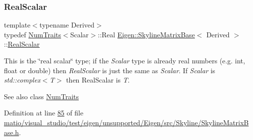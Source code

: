 \subsubsection{\texorpdfstring{Real\+Scalar}{RealScalar}\hspace{0.1cm}{\footnotesize\ttfamily [2/2]}}
{\footnotesize\ttfamily template$<$typename Derived$>$ \\
typedef \hyperlink{group___core___module_struct_eigen_1_1_num_traits}{Num\+Traits}$<$Scalar$>$\+::Real \hyperlink{class_eigen_1_1_skyline_matrix_base}{Eigen\+::\+Skyline\+Matrix\+Base}$<$ Derived $>$\+::\hyperlink{class_eigen_1_1_skyline_matrix_base_a24c532ab7e339b956a637a4a968e1565}{Real\+Scalar}}

This is the \char`\"{}real scalar\char`\"{} type; if the {\itshape Scalar} type is already real numbers (e.\+g. int, float or double) then {\itshape Real\+Scalar} is just the same as {\itshape Scalar}. If {\itshape Scalar} is {\itshape std\+::complex$<$\+T$>$} then Real\+Scalar is {\itshape T}.

\begin{DoxySeeAlso}{See also}
class \hyperlink{group___core___module_struct_eigen_1_1_num_traits}{Num\+Traits} 
\end{DoxySeeAlso}


Definition at line \hyperlink{matio_2visual__studio_2test_2eigen_2unsupported_2_eigen_2src_2_skyline_2_skyline_matrix_base_8h_source_l00085}{85} of file \hyperlink{matio_2visual__studio_2test_2eigen_2unsupported_2_eigen_2src_2_skyline_2_skyline_matrix_base_8h_source}{matio/visual\+\_\+studio/test/eigen/unsupported/\+Eigen/src/\+Skyline/\+Skyline\+Matrix\+Base.\+h}.

\mbox{\label{class_eigen_1_1_skyline_matrix_base_a2cc6375aec33f8ed497d1729f8888899}} 
